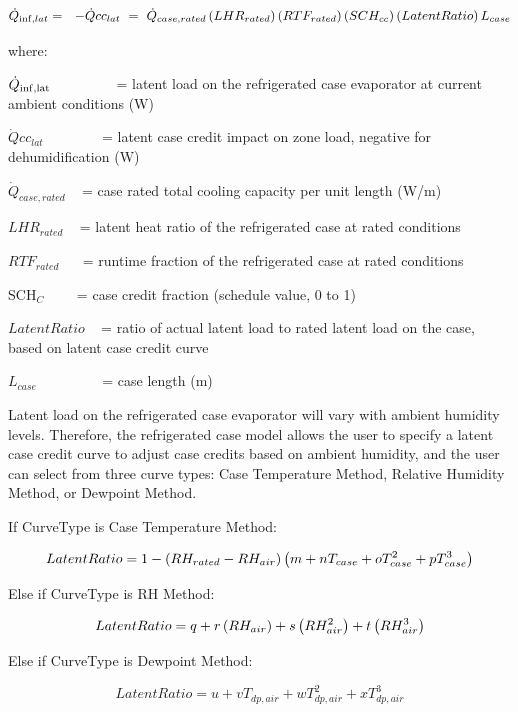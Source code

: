 \begin{equation}
{\dot Q_{{\rm{inf}},lat}} = \,\,\,\, - \dot Qc{c_{lat}}\,\, = \,\,{\dot Q_{case,rated}}\left( {LH{R_{rated}}} \right)\left( {RT{F_{rated}}} \right)\left( {SC{H_{cc}}} \right)\left( {LatentRatio} \right){L_{case}}
\end{equation}

where:

\({\dot Q_{{\rm{inf,lat}}}}\) ~~~~~~~~ = latent load on the refrigerated case evaporator at current ambient conditions (W)

\(\dot Qc{c_{lat}}\) ~~~~~~~ = latent case credit impact on zone load, negative for dehumidification (W)

\({\dot Q_{case,rated}}\) ~ = case rated total cooling capacity per unit length (W/m)

\(LH{R_{rated}}\) ~ = latent heat ratio of the refrigerated case at rated conditions

\(RT{F_{rated}}\) ~~ = runtime fraction of the refrigerated case at rated conditions

SCH\(_{C}\)~~~~ = case credit fraction (schedule value, 0 to 1)

\(LatentRatio\) ~ = ratio of actual latent load to rated latent load on the case, based on latent case credit curve

\({L_{case}}\) ~~~~~~~~ = case length (m)

Latent load on the refrigerated case evaporator will vary with ambient humidity levels. Therefore, the refrigerated case model allows the user to specify a latent case credit curve to adjust case credits based on ambient humidity, and the user can select from three curve types: Case Temperature Method, Relative Humidity Method, or Dewpoint Method.

If CurveType is Case Temperature Method:

\begin{equation}
  LatentRatio = 1-\PB{RH_{rated}-RH_{air}}\PB{m+nT_{case}+oT_{case}^2+pT_{case}^3}
\end{equation}

Else if CurveType is RH Method:

\begin{equation}
  LatentRatio = q + r\PB{RH_{air}} + s\PB{RH_{air}^2} + t\PB{RH_{air}^3}
\end{equation}

Else if CurveType is Dewpoint Method:

\begin{equation}
  LatentRatio = u + vT_{dp,air} + wT_{dp,air}^2 + xT_{dp,air}^3
\end{equation}


